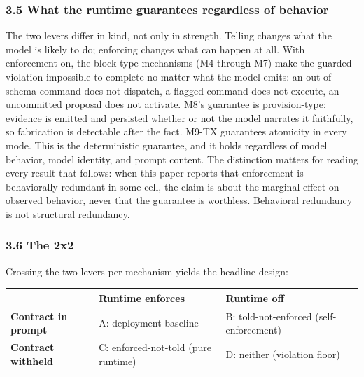\documentclass[
]{article}
\newcounter{none} %
\begin{document}
\subsubsection{3.5 What the runtime guarantees regardless of
behavior}\label{what-the-runtime-guarantees-regardless-of-behavior}

The two levers differ in kind, not only in strength. Telling changes
what the model is likely to do; enforcing changes what can happen at
all. With enforcement on, the block-type mechanisms (M4 through M7) make
the guarded violation impossible to complete no matter what the model
emits: an out-of-schema command does not dispatch, a flagged command
does not execute, an uncommitted proposal does not activate. M8's
guarantee is provision-type: evidence is emitted and persisted whether
or not the model narrates it faithfully, so fabrication is detectable
after the fact. M9-TX guarantees atomicity in every mode. This is the
deterministic guarantee, and it holds regardless of model behavior,
model identity, and prompt content. The distinction matters for reading
every result that follows: when this paper reports that enforcement is
behaviorally redundant in some cell, the claim is about the marginal
effect on observed behavior, never that the guarantee is worthless.
Behavioral redundancy is not structural redundancy.

\subsubsection{3.6 The 2x2}\label{the-2x2}

Crossing the two levers per mechanism yields the headline design:

{\def\LTcaptype{none} %
\begin{longtable}[]{@{}
  >{\raggedright\arraybackslash}p{}
  >{\raggedright\arraybackslash}p{}
  >{\raggedright\arraybackslash}p{}@{}}
\toprule\noalign{}
\begin{minipage}[b]{\linewidth}\raggedright
\end{minipage} & \begin{minipage}[b]{\linewidth}\raggedright
Runtime enforces
\end{minipage} & \begin{minipage}[b]{\linewidth}\raggedright
Runtime off
\end{minipage} \\
\midrule\noalign{}
\endhead
\bottomrule\noalign{}
\endlastfoot
\textbf{Contract in prompt} & A: deployment baseline & B:
told-not-enforced (self-enforcement) \\
\textbf{Contract withheld} & C: enforced-not-told (pure runtime) & D:
neither (violation floor) \\
\end{longtable}
}
\end{document}
